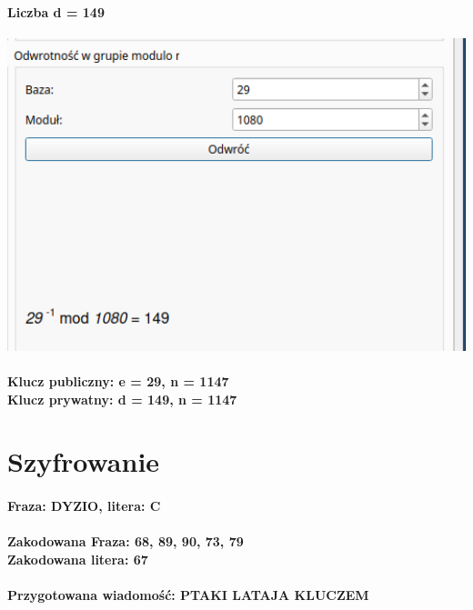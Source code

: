 \documentclass{article}[12pt]
\begin{document}
\paragraph{Liczba d = 149 \\}  
\includegraphics[width=1\textwidth]{three.png}
\paragraph{Klucz publiczny:  e = 29, n = 1147 \\ Klucz prywatny: d = 149, n = 1147}

\section{Szyfrowanie}
\paragraph{Fraza: DYZIO, litera: C}
\paragraph{Zakodowana Fraza: 68, 89, 90, 73, 79 \\ Zakodowana litera: 67}
\paragraph{Przygotowana wiadomość: PTAKI LATAJA KLUCZEM}
\end{document}
